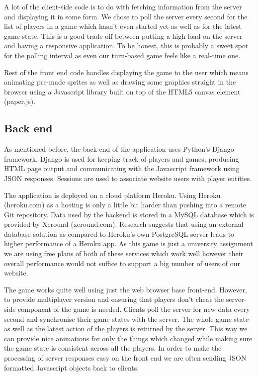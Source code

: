 \documentclass{article}
\begin{document}
A lot of the client-side code is to do with fetching information from the server and displaying it in some form. We chose to poll the server every second for the list of players in a game which hasn't even started yet as well as for the latest game state. This is a good trade-off between putting a high load on the server and having a responsive application. To be honest, this is probably a sweet spot for the polling interval as even our turn-based game feels like a real-time one.

Rest of the front end code handles displaying the game to the user which means animating pre-made sprites as well as drawing some graphics straight in the browser using a Javascript library built on top of the HTML5 canvas element (paper.js).

\subsection{Back end}
As mentioned before, the back end of the application uses Python's Django framework. Django is used for keeping track of players and games, producing HTML page output and communicating with the Javascript framework using JSON responses. Sessions are used to associate website users with player entities.

The application is deployed on a cloud platform Heroku. Using Heroku (heroku.com) as a hosting is only a little bit harder than pushing into a remote Git repository. Data used by the backend is stored in a MySQL database which is provided by Xeround (xeround.com). Research suggests that using an external database solution as compared to Heroku's own PostgreSQL server leads to higher performance of a Heroku app. As this game is just a university assignment we are using free plans of both of these services which work well however their overall performance would not suffice to support a big number of users of our website.

The game works quite well using just the web browser base front-end. However, to provide multiplayer version and ensuring that players don't cheat the server-side component of the game is needed. Clients poll the server for new data every second and synchronise their game states with the server. The whole game state as well as the latest action of the players is returned by the server. This way we can provide nice animations for only the things which changed while making sure the game state is consistent across all the players. In order to make the processing of server responses easy on the front end we are often sending JSON formatted Javascript objects back to clients.
\end{document}
